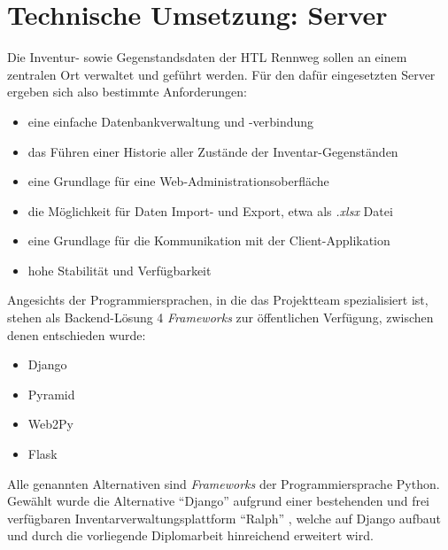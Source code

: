 \hypertarget{technische-umsetzung-server}{%
\section{Technische Umsetzung:
Server}\label{technische-umsetzung-server}}

Die Inventur- sowie Gegenstandsdaten der HTL Rennweg sollen an einem
zentralen Ort verwaltet und geführt werden. Für den dafür eingesetzten
Server ergeben sich also bestimmte Anforderungen:

\begin{itemize}
\tightlist
\item
  eine einfache Datenbankverwaltung und -verbindung
\item
  das Führen einer Historie aller Zustände der Inventar-Gegenständen
\item
  eine Grundlage für eine Web-Administrationsoberfläche
\item
  die Möglichkeit für Daten Import- und Export, etwa als
  \emph{.xlsx} Datei
\item
  eine Grundlage für die Kommunikation mit der Client-Applikation
\item
  hohe Stabilität und Verfügbarkeit
\end{itemize}

Angesichts der Programmiersprachen, in die das Projektteam spezialisiert
ist, stehen als Backend-Lösung 4
\emph{Frameworks}
zur öffentlichen Verfügung, zwischen denen entschieden wurde:

\begin{itemize}
\tightlist
\item
  Django \cite{django}
\item
  Pyramid \cite{pyramid}
\item
  Web2Py \cite{web2py}
\item
  Flask \cite{flask}
\end{itemize}

Alle genannten Alternativen sind
\emph{Frameworks}
der Programmiersprache Python. Gewählt wurde die Alternative ``Django''
aufgrund einer bestehenden und frei verfügbaren
Inventarverwaltungsplattform ``Ralph'' \cite{ralph}, welche auf Django
aufbaut und durch die vorliegende Diplomarbeit hinreichend erweitert
wird.

